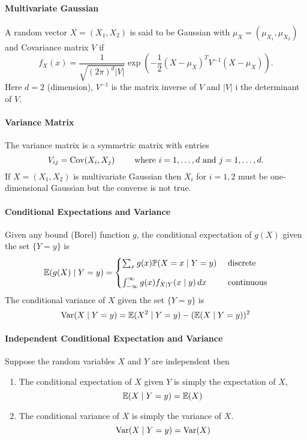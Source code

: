 \paragraph{Multivariate Gaussian}
A random vector \(X = (X_1, X_2)\) is said to be Gaussian with \(\mu_X = (\mu_{X_1}, \mu_{X_2})\) and Covariance matrix \(V\) if
\[f_X(x) = \frac{1}{\sqrt{(2\pi)^d|V|}}\exp(-\frac{1}{2}(X-\mu_X)^T V^{-1}(X-\mu_X)).\]
Here \(d = 2\) (dimension), \(V^{-1}\) is the matrix inverse of \(V\) and \(|V|\) i the determinant of \(V\).

\paragraph{Variance Matrix}
The variance matrix is a symmetric matrix with entries 
\[V_{ij} = \mathrm{Cov}(X_i, X_j) \qquad \text{ where } i = 1, \dots, d \text{ and } j = 1, \dots, d.\]
If \(X = (X_1, X_2)\) is multivariate Gaussian then \(X_i\) for \(i = 1,2\) must be one-dimensional Gaussian but the converse is not true. 

\paragraph{Conditional Expectations and Variance}
Given any bound (Borel) function \(g\), the conditional expectation of \(g(X)\) given the set \(\{ Y = y \}\) is
\[\mathbb{E}(g(X)\mid Y = y) = \begin{cases}
    \sum_{x} g(x) \mathbb{P}(X=x \mid Y=y) & \text{ discrete} \\[0.3cm]
    \int_{-\infty}^\infty g(x) f_{X\mid Y}(x \mid y) \, dx & \text{ continuous}
\end{cases}
\]
The conditional variance of \(X\) given the set \(\{ Y = y \}\) is 
\[\mathrm{Var}(X \mid Y = y) = \mathbb{E}(X^2 \mid Y = y) - (\mathbb{E}(X \mid Y = y))^2\]

\paragraph{Independent Conditional Expectation and Variance}
Suppose the random variables \(X\) and \(Y\) are independent then
\begin{enumerate}
    \item The conditional expectation of \(X\) given \(Y\) is simply the expectation of \(X\),
    \[\mathbb{E}(X \mid Y = y) = \mathbb{E}(X)\]
    \item The conditional variance of \(X\) is simply the variance of \(X\). 
    \[\mathrm{Var}(X \mid Y = y) = \mathrm{Var}(X)\]
\end{enumerate}

